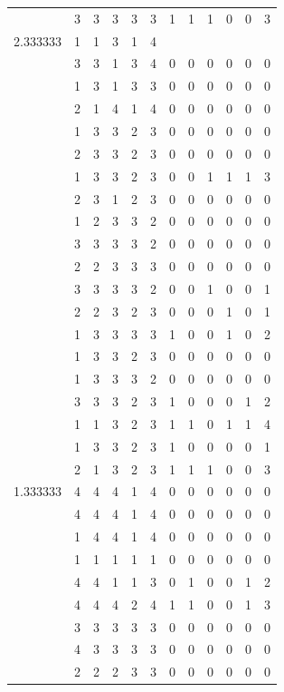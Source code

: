 \documentclass[]{book}
\theoremstyle{definition}
\theoremstyle{definition}
\theoremstyle{definition}
\theoremstyle{remark}
\begin{document}
\begin{table}
{\begin{tabular}[t]{rrrrrrrrrrrr}
 & 3 & 3 & 3 & 3 & 3 & 1 & 1 & 1 & 0 & 0 & 3\\
2.333333 & 1 & 1 & 3 & 1 & 4 &  &  &  &  &  & \\
 & 3 & 3 & 1 & 3 & 4 & 0 & 0 & 0 & 0 & 0 & 0\\
 & 1 & 3 & 1 & 3 & 3 & 0 & 0 & 0 & 0 & 0 & 0\\
 & 2 & 1 & 4 & 1 & 4 & 0 & 0 & 0 & 0 & 0 & 0\\
 & 1 & 3 & 3 & 2 & 3 & 0 & 0 & 0 & 0 & 0 & 0\\
 & 2 & 3 & 3 & 2 & 3 & 0 & 0 & 0 & 0 & 0 & 0\\
 & 1 & 3 & 3 & 2 & 3 & 0 & 0 & 1 & 1 & 1 & 3\\
 & 2 & 3 & 1 & 2 & 3 & 0 & 0 & 0 & 0 & 0 & 0\\
 & 1 & 2 & 3 & 3 & 2 & 0 & 0 & 0 & 0 & 0 & 0\\
 & 3 & 3 & 3 & 3 & 2 & 0 & 0 & 0 & 0 & 0 & 0\\
 & 2 & 2 & 3 & 3 & 3 & 0 & 0 & 0 & 0 & 0 & 0\\
 & 3 & 3 & 3 & 3 & 2 & 0 & 0 & 1 & 0 & 0 & 1\\
 & 2 & 2 & 3 & 2 & 3 & 0 & 0 & 0 & 1 & 0 & 1\\
 & 1 & 3 & 3 & 3 & 3 & 1 & 0 & 0 & 1 & 0 & 2\\
 & 1 & 3 & 3 & 2 & 3 & 0 & 0 & 0 & 0 & 0 & 0\\
 & 1 & 3 & 3 & 3 & 2 & 0 & 0 & 0 & 0 & 0 & 0\\
 & 3 & 3 & 3 & 2 & 3 & 1 & 0 & 0 & 0 & 1 & 2\\
 & 1 & 1 & 3 & 2 & 3 & 1 & 1 & 0 & 1 & 1 & 4\\
 & 1 & 3 & 3 & 2 & 3 & 1 & 0 & 0 & 0 & 0 & 1\\
 & 2 & 1 & 3 & 2 & 3 & 1 & 1 & 1 & 0 & 0 & 3\\
1.333333 & 4 & 4 & 4 & 1 & 4 & 0 & 0 & 0 & 0 & 0 & 0\\
 & 4 & 4 & 4 & 1 & 4 & 0 & 0 & 0 & 0 & 0 & 0\\
 & 1 & 4 & 4 & 1 & 4 & 0 & 0 & 0 & 0 & 0 & 0\\
 & 1 & 1 & 1 & 1 & 1 & 0 & 0 & 0 & 0 & 0 & 0\\
 & 4 & 4 & 1 & 1 & 3 & 0 & 1 & 0 & 0 & 1 & 2\\
 & 4 & 4 & 4 & 2 & 4 & 1 & 1 & 0 & 0 & 1 & 3\\
 & 3 & 3 & 3 & 3 & 3 & 0 & 0 & 0 & 0 & 0 & 0\\
 & 4 & 3 & 3 & 3 & 3 & 0 & 0 & 0 & 0 & 0 & 0\\
 & 2 & 2 & 2 & 3 & 3 & 0 & 0 & 0 & 0 & 0 & 0\\

\end{tabular}}
\end{table}
\end{document}

